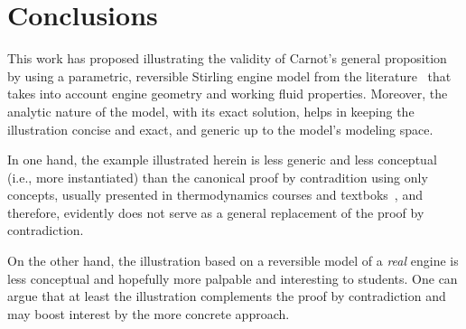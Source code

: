 \section{Conclusions}

    This   work   has   proposed    illustrating    the    validity    of    Carnot's    general
    proposition~\cite{1897-ThurstonRH-Wiley} by using a parametric, reversible  Stirling  engine
    model from the literature~\cite{2012-ChengCH+YangHS-ApEnergy} that takes into account engine
    geometry and working fluid properties. Moreover, the analytic nature of the model, with  its
    exact solution, helps in keeping the illustration concise and exact, and generic up  to  the
    model's modeling space.

    In one hand, the example illustrated herein is less generic and less conceptual (i.e.,  more
    instantiated) than  the  canonical  proof  by  contradition  using  only  concepts,  usually
    presented   in   thermodynamics   courses   and   textboks~\cite{2013-CengelYA+BolesMA-AMGH,
    2002-MoranMJ+ShapiroHN-LTC, 1986-JonesJB+HawkinsGA-Wiley}, and therefore, evidently does not
    serve as a general replacement of the proof by contradiction.

    On the other hand, the illustration based on a reversible model of a \emph{real}  engine  is
    less conceptual and hopefully more palpable and interesting to students. One can argue  that
    at least the illustration complements the proof by contradiction and may boost  interest  by
    the more concrete approach.


